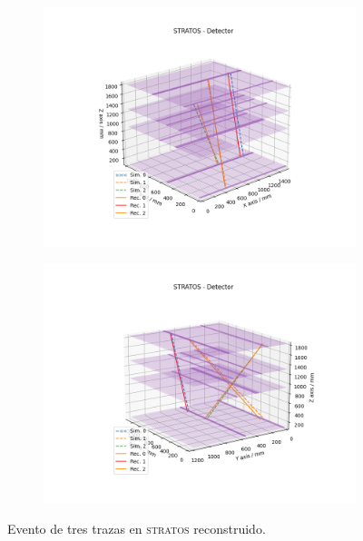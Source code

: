 \documentclass[a4paper]{article}
\begin{document}
\begin{figure}[H]
  \begin{subfigure}[b]{0.5\linewidth}
    \centering
    \includegraphics[trim={3.5cm 1cm 2.5cm 1.9cm},clip,width=\linewidth]{stratos_angle1.png} 
    \caption{} 
    \label{fg:4-c} 
  \end{subfigure}%
  \begin{subfigure}[b]{0.5\linewidth}
    \centering
    \includegraphics[trim={2.5cm 1cm 2.5cm 1.9cm},clip,width=\linewidth]{stratos_angle2.png} 
    \caption{} 
    \label{fg:4-d} 
  \end{subfigure} 
  \caption{Evento de tres trazas en \textsc{stratos} reconstruido.}
  \label{fg:4} 
\end{figure}
\end{document}
